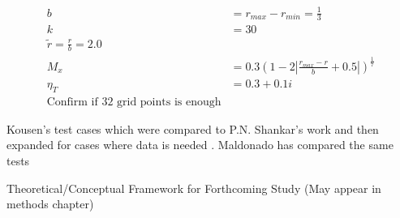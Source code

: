 \documentclass[a4paper]{report}
\begin{document}
\begin{outline}[enumerate]
\begin{itemize}
\begin{align*}
                b &= r_{max} - r_{min}  = \frac{1}{3}\\
                k &= 30 \\
                \tilde{r} = \frac{r}{b} = 2.0 \\
                M_x &= 0.3\left(1 - 2 \left| \frac{r_{max}-r}{b} + 0.5 \right|  \right)^{\frac{1}{7}} \\
                \eta_T &= 0.3 + 0.1i\\
                \text{Confirm if 32 grid points is enough}
            \end{align*}
    \end{itemize}

    \4[-] Kousen's test cases which were compared to P.N. Shankar's work and 
    then expanded for cases where data is needed . Maldonado has compared the same
    tests

    \2 Theoretical/Conceptual Framework for Forthcoming Study (May appear in 
    methods chapter)


\end{outline}
\end{document}
